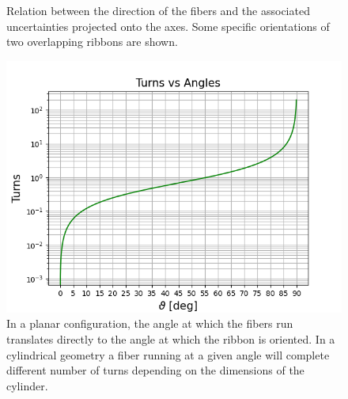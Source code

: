 \begin{refsection}
\begin{figure}
{        \label{fig:CyFi:examples:a}}
        \caption{Relation between the direction of the fibers and the associated uncertainties projected onto the axes. Some specific orientations of two overlapping ribbons are shown.}
    \end{figure}
    \begin{figure}
        \centering
        \includegraphics[width=\textwidth]{Figures/muEDM/CyFi/TurnsVsAngles.png}
        \caption{In a planar configuration, the angle at which the fibers run translates directly to the angle at which the ribbon is oriented. In a cylindrical geometry a fiber running at a given angle will complete different number of turns depending on the dimensions of the cylinder.}
        \label{fig:CyFi:TurnsVsAngles}
    \end{figure}
    \begin{figure}[ht]   

\end{figure}
\end{refsection}

